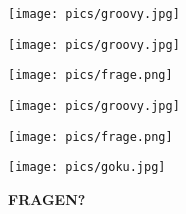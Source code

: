 \documentclass{beamer}
\begin{document}
\begin{frame}
\centerline{\texttt{[image: pics/groovy.jpg]}}
\end{frame}

\begin{frame}
\centerline{\texttt{[image: pics/groovy.jpg]}}
\centerline{\texttt{[image: pics/frage.png]}}
\end{frame}


\begin{frame}
\centerline{\texttt{[image: pics/groovy.jpg]}}
\centerline{\texttt{[image: pics/frage.png]}}
\end{frame}

\begin{frame}
\centerline{\texttt{[image: pics/goku.jpg]}}
\vspace{2cm}
\centerline{{\bf \Huge FRAGEN?}}
\end{frame}
\end{document}
